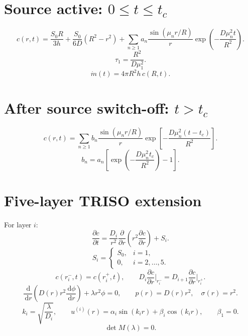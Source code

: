 \documentclass[11pt,a4paper]{article}
\newcommand{\dd}{\,\mathrm{d}}
\begin{document}
\section{Source active: $0\le t\le t_c$}
\begin{equation}
\boxed{
c(r,t)=\frac{S_0R}{3h}+\frac{S_0}{6D}(R^2-r^2)
+\sum_{n\ge1}a_n\frac{\sin(\mu_nr/R)}{r}
\exp\left(-\frac{D\mu_n^2t}{R^2}\right)}.
\end{equation}
\begin{equation}
\tau_1=\frac{R^2}{D\mu_1^2}.
\end{equation}
\begin{equation}
\dot m(t)=4\pi R^2h\,c(R,t).
\end{equation}

\section{After source switch-off: $t>t_c$}
\begin{equation}
c(r,t)=\sum_{n\ge1}b_n\frac{\sin(\mu_nr/R)}{r}
\exp\left[-\frac{D\mu_n^2(t-t_c)}{R^2}\right].
\end{equation}
\begin{equation}
\boxed{b_n=a_n\left[\exp\left(-\frac{D\mu_n^2t_c}{R^2}\right)-1\right]}.
\end{equation}

\section{Five-layer TRISO extension}
For layer $i$:
\begin{equation}
\frac{\partial c}{\partial t}
=\frac{D_i}{r^2}\frac{\partial}{\partial r}\left(r^2\frac{\partial c}{\partial r}\right)+S_i.
\end{equation}
\begin{equation}
S_i=\begin{cases}S_0,&i=1,\\0,&i=2,\ldots,5.\end{cases}
\end{equation}
\begin{equation}
c(r_i^-,t)=c(r_i^+,t),\qquad
D_i\frac{\partial c}{\partial r}\bigg|_{r_i^-}
=D_{i+1}\frac{\partial c}{\partial r}\bigg|_{r_i^+}.
\end{equation}
\begin{equation}
\frac{\dd}{\dd r}\left(D(r)r^2\frac{\dd\phi}{\dd r}\right)+\lambda r^2\phi=0,
\qquad p(r)=D(r)r^2,\quad \sigma(r)=r^2.
\end{equation}
\begin{equation}
k_i=\sqrt{\frac{\lambda}{D_i}},\qquad
u^{(i)}(r)=\alpha_i\sin(k_ir)+\beta_i\cos(k_ir),\qquad \beta_1=0.
\end{equation}
\begin{equation}
\boxed{\det M(\lambda)=0}.
\end{equation}
\end{document}
